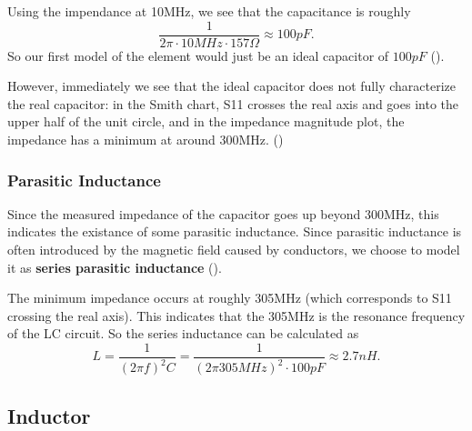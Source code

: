 \documentclass{article}
\begin{document}
Using the impendance at 10MHz, we see that the capacitance is roughly
$$\frac{1}{2\pi\cdot 10MHz \cdot 157 \Omega} \approx 100pF .$$
So our first model of the element would just be an ideal capacitor of $100pF$ ().

However, immediately we see that the ideal capacitor does not fully characterize the real capacitor: in the Smith chart, S11 crosses the real axis and goes into the upper half of the unit circle, and in the impedance magnitude plot, the impedance has a minimum at around 300MHz.
()

\subsubsection{Parasitic Inductance}
Since the measured impedance of the capacitor goes up beyond 300MHz, this indicates the existance of some parasitic inductance.
Since parasitic inductance is often introduced by the magnetic field caused by conductors, we choose to model it as \textbf{series parasitic inductance} ().

The minimum impedance occurs at roughly 305MHz (which corresponds to S11 crossing the real axis).
This indicates that the 305MHz is the resonance frequency of the LC circuit.
So the series inductance can be calculated as
\[
    L = \frac{1}{(2\pi f)^2 C}
    = \frac{1}{(2\pi 305MHz)^2 \cdot 100pF}
    \approx
    2.7nH.
\]

\subsection{Inductor}
\end{document}
